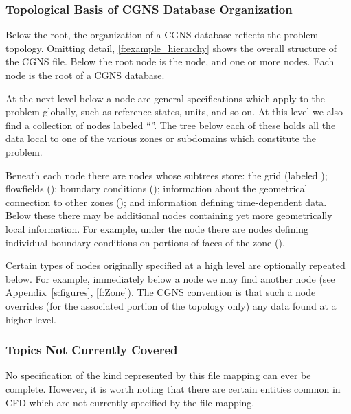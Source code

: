 \subsubsection{Topological Basis of CGNS Database Organization}

Below the root, the organization of a CGNS database reflects the problem
topology.
Omitting detail, \autoref{f:example_hierarchy} shows the overall
structure of the CGNS file.
Below the root node is the  node, and
one or more  nodes.
Each  node is the root of a CGNS database.

At the next level below a  node are general
specifications which apply to the problem globally, such as reference
states, units, and so on.
At this level we also find a collection of nodes labeled
``''.
The tree below each of these holds all the data local to one of the
various zones or subdomains which constitute the problem.

Beneath each  node there are nodes whose subtrees
store: the grid (labeled ); flowfields
(); boundary conditions ();
information about the geometrical connection to other zones
(); and information defining time-dependent
data. Below these there may be additional nodes containing yet more
geometrically local information. For example, under the 
node there are nodes defining individual boundary conditions on portions
of faces of the zone ().

Certain types of nodes originally specified at a high level are
optionally repeated below. For example, immediately below a
 node we may find another 
node (see \hyperref[s:figures]{Appendix~\ref*{s:figures}},
\autoref{f:Zone}). The CGNS convention is that such a node overrides
(for the associated portion of the topology only) any data found at a
higher level.

\subsubsection{Topics Not Currently Covered}
\label{s:notcovered}

No specification of the kind represented by this file mapping can ever
be complete. However, it is worth noting that there are certain entities
common in CFD which are not currently specified by the file mapping.

